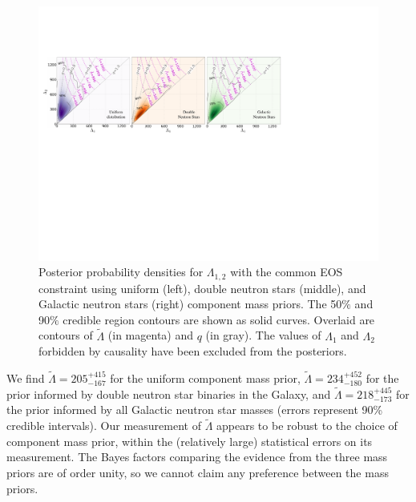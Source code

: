 \begin{figure}[t]
  \includegraphics[width=\textwidth]{figures/common_eos/Lambda1_2_contours_no1D_w_q_moreiter.pdf}
  \caption{Posterior probability densities for $\Lambda_{1,2}$ with the common EOS constraint using uniform (left), double neutron stars (middle), and Galactic neutron stars (right) component mass priors. The 50$\%$ and 90$\%$ credible region contours are shown as solid curves. Overlaid are contours of $\tilde{\Lambda}$ (in magenta) and $q$ (in gray). The values of $\Lambda_1$ and $\Lambda_2$ forbidden by causality have been excluded from the posteriors.
\label{fig:lamb12_1abc}
%
}
\end{figure}

We find $\tilde{\Lambda}=
205^{+415}_{-167}$ for the uniform component mass prior, $\tilde{\Lambda}=234^{+452}_{-180}$ for the prior informed by double neutron star binaries in the Galaxy, and $\tilde{\Lambda}=218^{+445}_{-173}$ for the prior informed by all Galactic neutron star masses (errors represent 90\% credible intervals). Our measurement of $\tilde{\Lambda}$ appears to be robust to the choice of component mass prior, within the (relatively large) statistical errors on its measurement. The Bayes factors comparing the evidence from the three mass priors are of order unity, so we cannot claim any preference between the mass priors.

